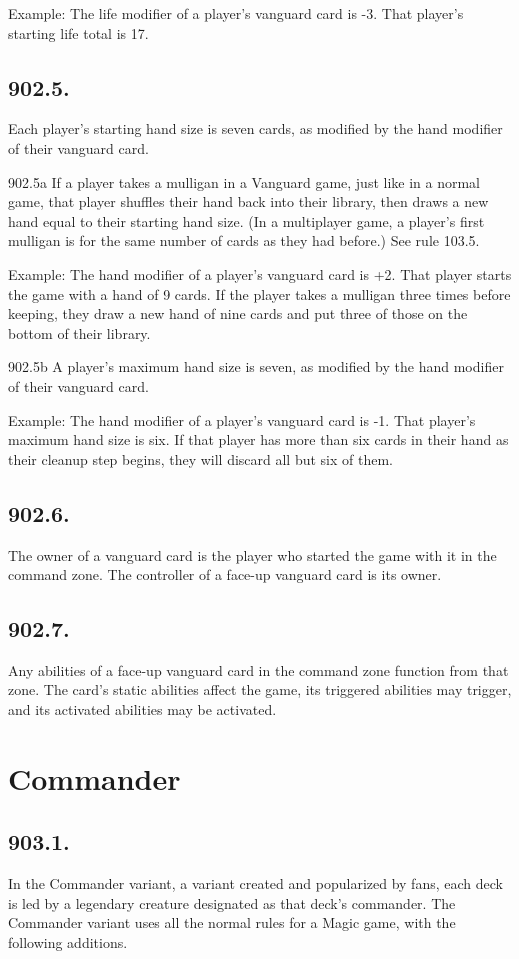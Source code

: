 Example: The life modifier of a player’s vanguard card is -3. That player’s starting life total is 17.

\subsection*{902.5.}
Each player’s starting hand size is seven cards, as modified by the hand modifier of their vanguard card.

902.5a If a player takes a mulligan in a Vanguard game, just like in a normal game, that player shuffles their hand back into their library, then draws a new hand equal to their starting hand size. (In a multiplayer game, a player’s first mulligan is for the same number of cards as they had before.) See rule 103.5.

Example: The hand modifier of a player’s vanguard card is +2. That player starts the game with a hand of 9 cards. If the player takes a mulligan three times before keeping, they draw a new hand of nine cards and put three of those on the bottom of their library.

902.5b A player’s maximum hand size is seven, as modified by the hand modifier of their vanguard card.

Example: The hand modifier of a player’s vanguard card is -1. That player’s maximum hand size is six. If that player has more than six cards in their hand as their cleanup step begins, they will discard all but six of them.

\subsection*{902.6.}
The owner of a vanguard card is the player who started the game with it in the command zone. The controller of a face-up vanguard card is its owner.

\subsection*{902.7.}
Any abilities of a face-up vanguard card in the command zone function from that zone. The card’s static abilities affect the game, its triggered abilities may trigger, and its activated abilities may be activated.

\section{Commander}
\subsection*{903.1.}
In the Commander variant, a variant created and popularized by fans, each deck is led by a legendary creature designated as that deck’s commander. The Commander variant uses all the normal rules for a Magic game, with the following additions.

